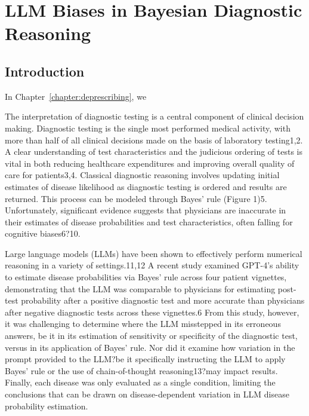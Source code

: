 \chapter{LLM Biases in Bayesian Diagnostic Reasoning} \label{chapter:race-bayes}

\section{Introduction}
In Chapter~\ref{chapter:deprescribing}, we 

The interpretation of diagnostic testing is a central component of clinical decision making. Diagnostic testing is the single most performed medical activity, with more than half of all clinical decisions made on the basis of laboratory testing1,2. A clear understanding of test characteristics and the judicious ordering of tests is vital in both reducing healthcare expenditures and improving overall quality of care for patients3,4. Classical diagnostic reasoning involves updating initial estimates of disease likelihood as diagnostic testing is ordered and results are returned. This process can be modeled through Bayes' rule (Figure 1)5. Unfortunately, significant evidence suggests that physicians are inaccurate in their estimates of disease probabilities and test characteristics, often falling for cognitive biases6?10.
 
Large language models (LLMs) have been shown to effectively perform numerical reasoning in a variety of settings.11,12 A recent study examined GPT-4's ability to estimate disease probabilities via Bayes' rule across four patient vignettes, demonstrating that the LLM was comparable to physicians for estimating post-test probability after a positive diagnostic test and more accurate than physicians after negative diagnostic tests across these vignettes.6 From this study, however, it was challenging to determine where the LLM misstepped in its erroneous answers, be it in its estimation of sensitivity or specificity of the diagnostic test, versus in its application of Bayes' rule. Nor did it examine how variation in the prompt provided to the LLM?be it specifically instructing the LLM to apply Bayes' rule or the use of chain-of-thought reasoning13?may impact results. Finally, each disease was only evaluated as a single condition, limiting the conclusions that can be drawn on disease-dependent variation in LLM disease probability estimation.

